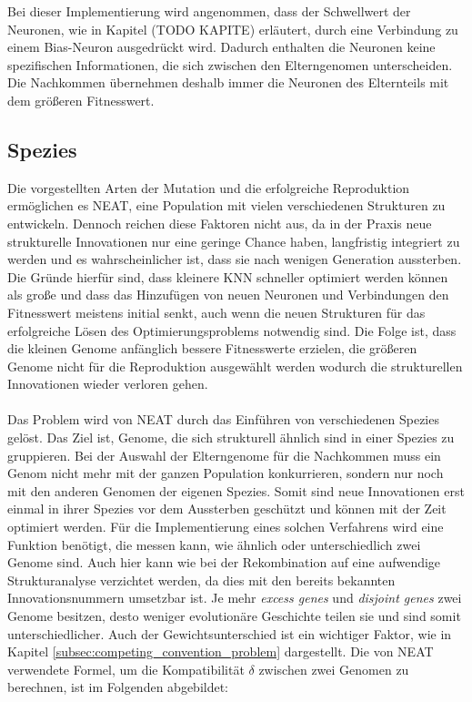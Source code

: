 Bei dieser Implementierung wird angenommen, dass der Schwellwert der Neuronen, wie in Kapitel (TODO KAPITE) erläutert, durch eine Verbindung zu einem Bias-Neuron ausgedrückt wird. Dadurch enthalten die Neuronen keine spezifischen Informationen, die sich zwischen den Elterngenomen unterscheiden. Die Nachkommen übernehmen deshalb immer die Neuronen des Elternteils mit dem größeren Fitnesswert.
\subsection{Spezies}
Die vorgestellten Arten der Mutation und die erfolgreiche Reproduktion ermöglichen es \ac{NEAT}, eine Population mit vielen verschiedenen Strukturen zu entwickeln. Dennoch reichen diese Faktoren nicht aus, da in der Praxis neue strukturelle Innovationen nur eine geringe Chance haben, langfristig integriert zu werden und es wahrscheinlicher ist, dass sie nach wenigen Generation aussterben. Die Gründe hierfür sind, dass kleinere \ac{KNN} schneller optimiert werden können als große und dass das Hinzufügen von neuen Neuronen und Verbindungen den Fitnesswert meistens initial senkt, auch wenn die neuen Strukturen für das erfolgreiche Lösen des Optimierungsproblems notwendig sind. Die Folge ist, dass die kleinen Genome anfänglich bessere Fitnesswerte erzielen, die größeren Genome nicht für die Reproduktion ausgewählt werden wodurch die strukturellen Innovationen wieder verloren gehen.
\\\\
Das Problem wird von \ac{NEAT} durch das Einführen von verschiedenen Spezies gelöst. Das Ziel ist, Genome, die sich strukturell ähnlich sind in einer Spezies zu gruppieren. Bei der Auswahl der Elterngenome für die Nachkommen muss ein Genom nicht mehr mit der ganzen Population konkurrieren, sondern nur noch mit den anderen Genomen der eigenen Spezies. Somit sind neue Innovationen erst einmal in ihrer Spezies vor dem Aussterben geschützt und können mit der Zeit optimiert werden. Für die Implementierung eines solchen Verfahrens wird eine Funktion benötigt, die messen kann, wie ähnlich oder unterschiedlich zwei Genome sind. Auch hier kann wie bei der Rekombination auf eine aufwendige Strukturanalyse verzichtet werden, da dies mit den bereits bekannten Innovationsnummern umsetzbar ist. Je mehr \emph{excess genes} und \emph{disjoint genes} zwei Genome besitzen, desto weniger evolutionäre Geschichte teilen sie und sind somit unterschiedlicher. Auch der Gewichtsunterschied ist ein wichtiger Faktor, wie in Kapitel \ref{subsec:competing_convention_problem} dargestellt. Die von \ac{NEAT} verwendete Formel, um die Kompatibilität $\delta$ zwischen zwei Genomen zu berechnen, ist im Folgenden abgebildet:

